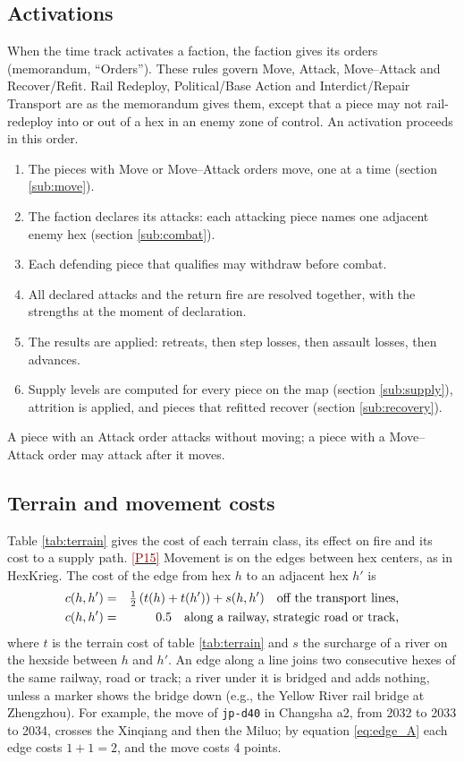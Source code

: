 \documentclass[11pt]{article}
\newcommand{\ptest}[1]{\hyperlink{ptest}{\textcolor{darkred}{[P#1]}}}
\begin{document}
\subsection{Activations}\label{sub:activations}
When the time track activates a faction, the faction gives its orders (memorandum, ``Orders''). These rules govern Move, Attack, Move--Attack and Recover/Refit. Rail Redeploy, Political/Base Action and Interdict/Repair Transport are as the memorandum gives them, except that a piece may not rail-redeploy into or out of a hex in an enemy zone of control. An activation proceeds in this order.
\begin{enumerate}
\item The pieces with Move or Move--Attack orders move, one at a time (section \ref{sub:move}).
\item The faction declares its attacks: each attacking piece names one adjacent enemy hex (section \ref{sub:combat}).
\item Each defending piece that qualifies may withdraw before combat.
\item All declared attacks and the return fire are resolved together, with the strengths at the moment of declaration.
\item The results are applied: retreats, then step losses, then assault losses, then advances.
\item Supply levels are computed for every piece on the map (section \ref{sub:supply}), attrition is applied, and pieces that refitted recover (section \ref{sub:recovery}).
\end{enumerate}
A piece with an Attack order attacks without moving; a piece with a Move--Attack order may attack after it moves.

\subsection{Terrain and movement costs}\label{sub:terrain}
Table \ref{tab:terrain} gives the cost of each terrain class, its effect on fire and its cost to a supply path. \ptest{15} Movement is on the edges between hex centers, as in HexKrieg. The cost of the edge from hex $h$ to an adjacent hex $h'$ is
\begin{eqnarray}
c(h,h') &=& \tfrac{1}{2}\left(t(h)+t(h')\right)+s(h,h') \mbox{\quad off the transport lines,} \label{eq:edge_A}\\
c(h,h') &=& 0.5 \mbox{\quad along a railway, strategic road or track,} \label{eq:edge_B}
\end{eqnarray}
where $t$ is the terrain cost of table \ref{tab:terrain} and $s$ the surcharge of a river on the hexside between $h$ and $h'$. An edge along a line joins two consecutive hexes of the same railway, road or track; a river under it is bridged and adds nothing, unless a marker shows the bridge down (e.g., the Yellow River rail bridge at Zhengzhou). For example, the move of \texttt{jp-d40} in Changsha a2, from 2032 to 2033 to 2034, crosses the Xinqiang and then the Miluo; by equation \eqref{eq:edge_A} each edge costs $1+1=2$, and the move costs 4 points.
\end{document}
